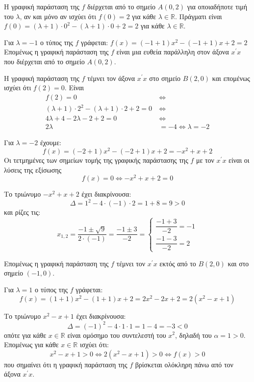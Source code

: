 
\begin{alist}
\item Η γραφική παράσταση της $f$ διέρχεται από το σημείο $A(0, 2)$ για οποιαδήποτε τιμή του $\lambda$, αν και μόνο αν ισχύει ότι $f(0) = 2$ για κάθε $\lambda \in \mathbb{R}$.
Πράγματι είναι $f(0) = (\lambda + 1) \cdot 0^2 - (\lambda + 1) \cdot 0 + 2 = 2$ για κάθε $\lambda \in \mathbb{R}$.

\item Για $\lambda = -1$ ο τύπος της $f$ γράφεται:
$f(x) = (-1 + 1)x^2 - (-1 + 1)x + 2 = 2$
Επομένως η γραφική παράσταση της $f$ είναι μια ευθεία παράλληλη στον άξονα $x^\prime x$ που διέρχεται από το σημείο $A(0, 2)$.

\item Η γραφική παράσταση της $f$ τέμνει τον άξονα $x^\prime x$ στο σημείο $B(2, 0)$ και επομένως ισχύει ότι $f(2) = 0$. Είναι
\begin{align*}
f(2) = 0 \ &\Leftrightarrow \\
(\lambda + 1) \cdot 2^2 - (\lambda + 1) \cdot 2 + 2 = 0 \ &\Leftrightarrow \\
4\lambda + 4 - 2\lambda - 2 + 2 = 0 \ &\Leftrightarrow \\
2\lambda &= -4 \Leftrightarrow \lambda = -2
\end{align*}

Για $\lambda = -2$ έχουμε:
\[f(x) = (-2 + 1)x^2 - (-2 + 1)x + 2 = -x^2 + x + 2\]
Οι τετμημένες των σημείων τομής της γραφικής παράστασης της $f$ με τον $x^\prime x$ είναι οι λύσεις της εξίσωσης
\[f(x) = 0 \Leftrightarrow -x^2 + x + 2 = 0\]

Το τριώνυμο $-x^2 + x + 2$ έχει διακρίνουσα:
\[\Delta = 1^2 - 4 \cdot (-1) \cdot 2 = 1 + 8 = 9 > 0\]
και ρίζες τις:
\[x_{1,2} = \dfrac{-1 \pm \sqrt{9}}{2 \cdot (-1)} = \dfrac{-1 \pm 3}{-2} = \begin{cases} \dfrac{-1 + 3}{-2} = -1 \\ \dfrac{-1 - 3}{-2} = 2 \end{cases}\]

Επομένως η γραφική παράσταση της $f$ τέμνει τον $x^\prime x$ εκτός από το $B(2, 0)$ και στο σημείο $(-1, 0)$.

\item Για $\lambda = 1$ ο τύπος της $f$ γράφεται:
\[f(x) = (1 + 1)x^2 - (1 + 1)x + 2 = 2x^2 - 2x + 2 = 2(x^2 - x + 1)\]

Το τριώνυμο $x^2 - x + 1$ έχει διακρίνουσα:
\[\Delta = (-1)^2 - 4 \cdot 1 \cdot 1 = 1 - 4 = -3 < 0\]
οπότε για κάθε $x \in \mathbb{R}$ είναι ομόσημο του συντελεστή του $x^2$, δηλαδή του $\alpha = 1 > 0$.
Επομένως για κάθε $x \in \mathbb{R}$ ισχύει ότι:
\[x^2 - x + 1 > 0 \Leftrightarrow 2(x^2 - x + 1) > 0 \Leftrightarrow f(x) > 0\]
που σημαίνει ότι η γραφική παράσταση της $f$ βρίσκεται ολόκληρη πάνω από τον άξονα $x^\prime x$.
\end{alist}

